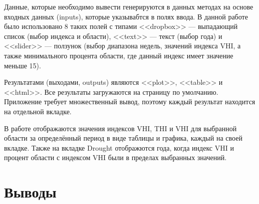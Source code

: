 Данные, которые необходимо вывести генерируются в данных методах на основе входных данных (inputs), которые указывабтся в полях ввода. В данной работе было использовано 8 таких полей с типами <<dropbox>> --- выпадающий список (выбор индекса и области), <<text>> --- текст (выбор года) и <<slider>> --- ползунок (выбор диапазона недель, значений индекса VHI, а также минимального процента области, где данный индекс имеет значение меньше 15).

Результатами (выходами, outputs) являются <<plot>>, <<table>> и <<html>>. Все результаты загружаются на страницу по умолчанию. Приложение требует множественный вывод, поэтому каждый результат находится на отдельной вкладке. 

В работе отображаются значения индексов VHI, THI и VHI для выбранной области за определённый период в виде таблицы и графика, каждый на своей вкладке. Также на вкладке Drought отображются года, когда индекс VHI и процент области с индексом VHI были в пределах выбранных значений.

\chapter*{Выводы}




